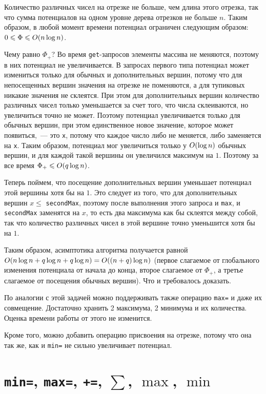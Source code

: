 Количество различных чисел на отрезке не больше, чем длина этого отрезка, так что сумма потенциалов на одном уровне дерева отрезков не больше $n$. Таким образом, в любой момент времени потенциал ограничен следующим образом: $0 \leqslant \Phi \leqslant O(n \log n)$.

Чему равно $\Phi_+$? Во время \verb+get+-запросов элементы массива не меняются, поэтому в них потенциал не увеличивается. В запросах первого типа потенциал может измениться только для обычных и дополнительных вершин, потому что для непосещенных вершин значения на отрезке не поменяются, а для тупиковых никакие значения не склеятся. При этом для дополнительных вершин количество различных чисел только уменьшается за счет того, что числа склеиваются, но увеличиться точно не может. Поэтому потенциал увеличивается только для обычных вершин, при этом единственное новое значение, которое может появиться,~--- это \verb+x+, потому что каждое число либо не меняется, либо заменяется на \verb+x+. Таким образом, потенциал мог увеличиться только у $O(\log n)$ обычных вершин, и для каждой такой вершины он увеличился максимум на $1$. Поэтому за все время $\Phi_+ \leqslant O(q \log n)$.

Теперь поймем, что посещение дополнительных вершин уменьшает потенциал этой вершины хотя бы на $1$. Это следует из того, что для дополнительных вершин $x \le $ \verb+secondMax+, поэтому после выполнения этого запроса и \verb+max+, и \verb+secondMax+ заменятся на $x$, то есть два максимума как бы склеятся между собой, так что количество различных чисел в этой вершине точно уменьшится хотя бы на $1$.

Таким образом, асимптотика алгоритма получается равной $O(n \log n + q \log n + q \log n) = O((n + q) \log n)$ (первое слагаемое от глобального изменения потенциала от начала до конца, второе слагаемое от $\Phi_+$, а третье слагаемое от посещения обычных вершин). Что и требовалось доказать.

\begin{observation} \label{segment tree beats: ji driver observation}
По аналогии с этой задачей можно поддерживать также операцию \verb+max=+ и даже их совмещение. Достаточно хранить 2 максимума, 2 минимума и их количества. Оценка времени работы от этого не изменится.

Кроме того, можно добавить операцию присвоения на отрезке, потому что она так же, как и \verb+min=+ не сильно увеличивает потенциал.
\end{observation}


\cprotect \section{\verb+min=+, \verb+max=+, \verb^+=^, $\sum$, $\max$, $\min$}

